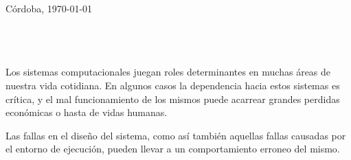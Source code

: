 \documentclass[titlepage, 12pt]{book}
\begin{document}
\begin{titlepage}
\begin{center}

\vfill

\begin{flushright}
{C\'ordoba, \today}
\end{flushright}

\end{center}
\end{titlepage}


\newpage
~\\

\newpage
\chapter*{}

Los sistemas computacionales juegan roles determinantes en muchas \'areas de nuestra vida cotidiana. En algunos casos la dependencia hacia estos sistemas es cr\'itica, y el mal funcionamiento de los mismos puede acarrear grandes perdidas econ\'omicas o hasta de vidas humanas.

Las fallas en el dise\~no del sistema, como as\'i tambi\'en aquellas fallas causadas por el entorno de ejecuci\'on, pueden llevar a un comportamiento erroneo del mismo.
%
\end{document}
